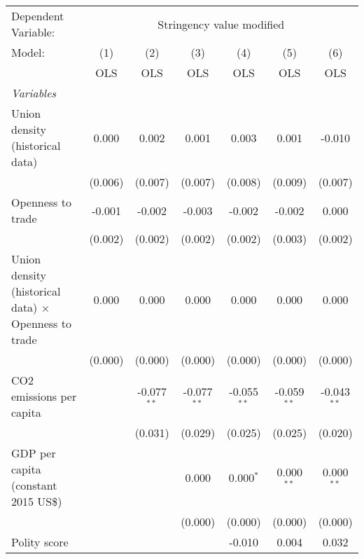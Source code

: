 
\begingroup
\centering
\begin{tabular}{lcccccc}
   \toprule
   Dependent Variable: & \multicolumn{6}{c}{Stringency value modified}\\
   Model:                                                      & (1)     & (2)           & (3)           & (4)           & (5)           & (6)\\  
                                                               &  OLS    & OLS           & OLS           & OLS           & OLS           & OLS\\  
   \midrule
   \emph{Variables}\\
   Union density (historical data)                             & 0.000   & 0.002         & 0.001         & 0.003         & 0.001         & -0.010\\   
                                                               & (0.006) & (0.007)       & (0.007)       & (0.008)       & (0.009)       & (0.007)\\   
   Openness to trade                                           & -0.001  & -0.002        & -0.003        & -0.002        & -0.002        & 0.000\\   
                                                               & (0.002) & (0.002)       & (0.002)       & (0.002)       & (0.003)       & (0.002)\\   
   Union density (historical data) $\times$ Openness to trade  & 0.000   & 0.000         & 0.000         & 0.000         & 0.000         & 0.000\\   
                                                               & (0.000) & (0.000)       & (0.000)       & (0.000)       & (0.000)       & (0.000)\\   
   CO2 emissions per capita                                    &         & -0.077$^{**}$ & -0.077$^{**}$ & -0.055$^{**}$ & -0.059$^{**}$ & -0.043$^{**}$\\   
                                                               &         & (0.031)       & (0.029)       & (0.025)       & (0.025)       & (0.020)\\   
   GDP per capita (constant 2015 US\$)                         &         &               & 0.000         & 0.000$^{*}$   & 0.000$^{**}$  & 0.000$^{**}$\\   
                                                               &         &               & (0.000)       & (0.000)       & (0.000)       & (0.000)\\   
   Polity score                                                &         &               &               & -0.010        & 0.004         & 0.032\\   

\end{tabular}
